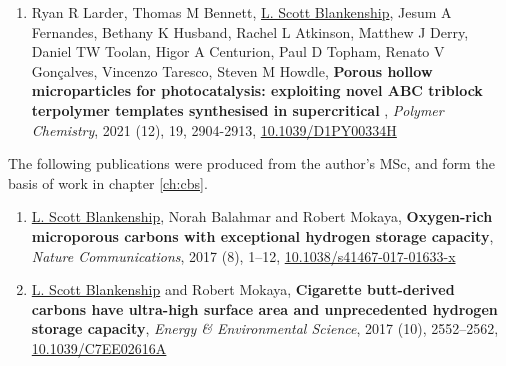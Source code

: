 \begin{enumerate}[resume, label=\Roman*, ref={\textbf{Publication \Roman*}}]
    \item Ryan R Larder, Thomas M Bennett, \underline{L. Scott Blankenship}, Jesum A Fernandes, Bethany K Husband, Rachel L Atkinson, Matthew J Derry, Daniel TW Toolan, Higor A Centurion, Paul D Topham, Renato V Gonçalves, Vincenzo Taresco, Steven M Howdle, \textbf{Porous hollow  microparticles for photocatalysis: exploiting novel ABC triblock terpolymer templates synthesised in supercritical }, \textit{Polymer Chemistry}, 2021 (12), 19, 2904-2913, \href{https://doi.org/10.1039/D1PY00334H}{10.1039/D1PY00334H}
    \label{pub:larder}
    
\end{enumerate}

The following publications were produced from the author's MSc, and form the basis of work in chapter \ref{ch:cbs}.

\begin{enumerate}[resume, label=\Roman*, ref={\textbf{Publication \Roman*}}]
    \item \underline{L. Scott Blankenship}, Norah Balahmar and Robert Mokaya, \textbf{Oxygen-rich microporous carbons with exceptional hydrogen storage capacity}, \textit{Nature Communications}, 2017 (8), 1–12, \href{https://doi.org/10.1038/s41467-017-01633-x}{10.1038/s41467-017-01633-x}
    \label{pub:CA}
    \item \underline{L. Scott Blankenship} and Robert Mokaya, \textbf{Cigarette butt-derived carbons have ultra-high surface area and unprecedented hydrogen storage capacity}, \textit{Energy \& Environmental Science}, 2017 (10), 2552–2562, \href{https://doi.org/10.1039/C7EE02616A}{10.1039/C7EE02616A}
    \label{pub:CB}
    
\end{enumerate}